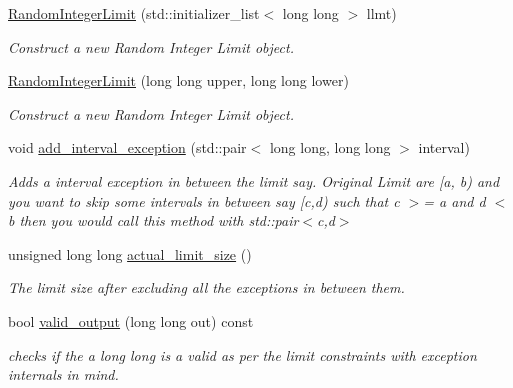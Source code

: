 \begin{DoxyCompactItemize}
\item 
\mbox{\hyperlink{classtestcaser_1_1maker_1_1RandomIntegerLimit_ae70b7c715a632c4a079a0c37452decbf}{Random\+Integer\+Limit}} (std\+::initializer\+\_\+list$<$ long long $>$ llmt)
\begin{DoxyCompactList}\small\item\em Construct a new Random Integer Limit object. \end{DoxyCompactList}\item 
\mbox{\hyperlink{classtestcaser_1_1maker_1_1RandomIntegerLimit_a43781197d959fc8ab6cf54258df35a64}{Random\+Integer\+Limit}} (long long upper, long long lower)
\begin{DoxyCompactList}\small\item\em Construct a new Random Integer Limit object. \end{DoxyCompactList}\item 
void \mbox{\hyperlink{classtestcaser_1_1maker_1_1RandomIntegerLimit_aab21ea4c9643021d1993da96408a9d6d}{add\+\_\+interval\+\_\+exception}} (std\+::pair$<$ long long, long long $>$ interval)
\begin{DoxyCompactList}\small\item\em Adds a interval exception in between the limit say. Original Limit are \mbox{[}a, b) and you want to skip some intervals in between say \mbox{[}c,d) such that c $>$= a and d $<$ b then you would call this method with std\+::pair$<$c,d$>$ \end{DoxyCompactList}\item 
unsigned long long \mbox{\hyperlink{classtestcaser_1_1maker_1_1RandomIntegerLimit_a657f8d368dbfe2e9269d1d499a728954}{actual\+\_\+limit\+\_\+size}} ()
\begin{DoxyCompactList}\small\item\em The limit size after excluding all the exceptions in between them. \end{DoxyCompactList}\item 
bool \mbox{\hyperlink{classtestcaser_1_1maker_1_1RandomIntegerLimit_a3015e3b8e3c490e9acad46faf8c2bc96}{valid\+\_\+output}} (long long out) const
\begin{DoxyCompactList}\small\item\em checks if the a long long is a valid as per the limit constraints with exception internals in mind. \end{DoxyCompactList}\end{DoxyCompactItemize}
